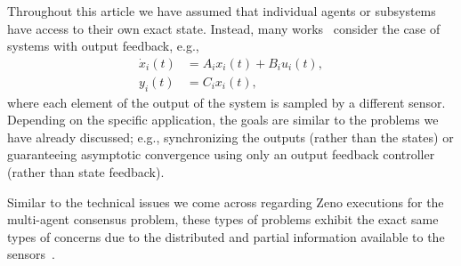 \documentclass{autart}
\newcommand{\marginJC}[1]{\marginpar{\color{green}\tiny\ttfamily#1}}
\newcommand{\margin}[1]{\marginpar{\color{red}\tiny\ttfamily#1}}
\begin{document}
{  Throughout this article we have assumed that individual agents or
  subsystems have access to their own exact state. Instead, many
  works~\citep{PT-NC:12,MCFD-WPMHH:12,WPMHH-MCFD-ART:13,PT-NC:14,FF-SG-DN-LZ:14,MMJ-MC:14,HY-PA:12,DT-RF:13,HZ-GF-HY-QC:14b,YC-MF-DD:16,WH-LL:17,HY-PJA:14,WH-LL-GF:16,TL-MC-DJH:14,BZ-XL-TH-HL-GC:16,VSD-DPB-WPMHH:17,WH-LL-GF:17,MA-RP-JD-DN:17,MSM-MS-ME:16}
  consider the case of systems with output feedback, e.g.,
  \begin{align*}
    \dot{x}_i(t)&=A_ix_i(t) + B_iu_i (t) ,
    \\
    y_i(t)&=C_ix_i(t) ,
  \end{align*}
  where each element of the output of the system is sampled by a
  different sensor. Depending on the specific application, the goals
  are similar to the problems we have already discussed; e.g.,
  synchronizing the outputs (rather than the states) or guaranteeing
  asymptotic convergence using only an output feedback controller
  (rather than state feedback). 
  
  Similar to the technical issues we come across regarding Zeno executions for the
  multi-agent consensus problem, these types of problems exhibit the exact same types
  of concerns due to the distributed and partial information available to the sensors~\cite{MCFD-WPMHH:12}.}


% 
% 
%
\end{document}
